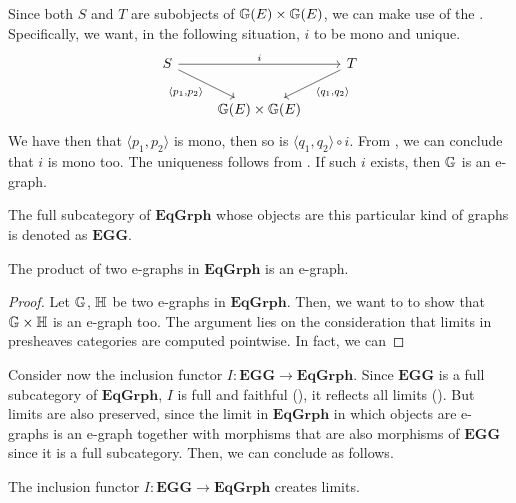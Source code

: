 Since both $S$ and $T$ are subobjects of $\mathbb{G}(E) \times \mathbb{G}(E)$, we can make use of the . Specifically, we want, in the following situation, $i$ to be mono and unique.
\[
    \begin{tikzcd}
        S \arrow[rr, "i"] \arrow[dr, "{\langle p_1, p_2 \rangle}"swap] & & T \arrow[dl, "{\langle q_1, q_2\rangle}"] \\
        & \eqgraph{G}(E) \times \eqgraph{G}(E)
    \end{tikzcd}
\]
We have then that $\langle p_1, p_2 \rangle$ is mono, then so is $\langle q_1, q_2 \rangle \circ i$. From , we can conclude that $i$ is mono too. The uniqueness follows from . If such $i$ exists, then $\mathbb{G}$ is an e-graph.

\begin{definition}\label{def:cat_of_eggs}
    The full subcategory of $\mathbf{EqGrph}$ whose objects are this particular kind of graphs is denoted as $\mathbf{EGG}$.
\end{definition}

\begin{prop}\label{prop:prod_of_EGGs_is_EGG}
    The product of two e-graphs in $\mathbf{EqGrph}$ is an e-graph.
\end{prop}

\begin{proof}
    Let $\mathbb{G}$, $\mathbb{H}$ be two e-graphs in $\mathbf{EqGrph}$. Then, we want to to show that $\mathbb{G \times H}$ is an e-graph too. The argument lies on the consideration that limits in presheaves categories are computed pointwise. In fact, we can 
\end{proof}

Consider now the inclusion functor $I: \mathbf{EGG} \rightarrow \mathbf{EqGrph}$. Since $\mathbf{EGG}$ is a full subcategory of $\mathbf{EqGrph}$, $I$ is full and faithful (), it reflects all limits (). But limits are also preserved, since the limit in $\mathbf{EqGrph}$ in which objects are e-graphs is an e-graph together with morphisms that are also morphisms of $\mathbf{EGG}$ since it is a full subcategory. Then, we can conclude as follows.

\begin{lemma}
    The inclusion functor $I: \mathbf{EGG \rightarrow EqGrph}$ creates limits.
\end{lemma}

